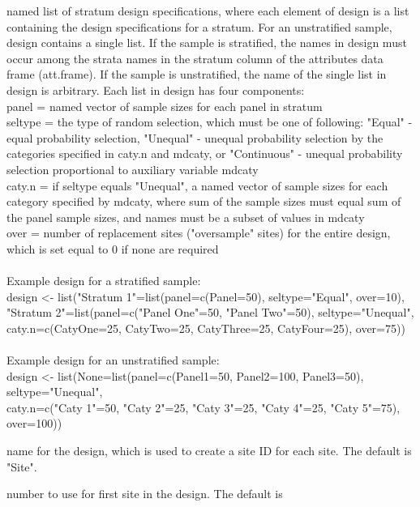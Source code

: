 \begin{Arguments}
\begin{ldescription}
\item[\code{design}] named list of stratum design specifications, where each element of
design is a list containing the design specifications for a stratum.  For
an unstratified sample, design contains a single list.  If the sample is
stratified, the names in design must occur among the strata names in the
stratum column of the attributes data frame (att.frame).  If the sample is
unstratified, the name of the single list in design is arbitrary.  Each
list in design has four components:\\
panel = named vector of sample sizes for each panel in stratum\\
seltype = the type of random selection, which must be one of following:
"Equal" - equal probability selection, "Unequal" - unequal probability
selection by the categories specified in caty.n and mdcaty, or
"Continuous" - unequal probability selection proportional to auxiliary
variable mdcaty\\
caty.n = if seltype equals "Unequal", a named vector of sample sizes for
each category specified by mdcaty, where sum of the sample sizes must
equal sum of the panel sample sizes, and names must be a subset of
values in mdcaty\\
over = number of replacement sites ("oversample" sites) for the entire
design, which is set equal to 0 if none are required\\\\
Example design for a stratified sample:\\
design <- list("Stratum 1"=list(panel=c(Panel=50), seltype="Equal",
over=10),\\ "Stratum 2"=list(panel=c("Panel One"=50, "Panel Two"=50),
seltype="Unequal",\\ caty.n=c(CatyOne=25, CatyTwo=25, CatyThree=25,
CatyFour=25), over=75))\\\\
Example design for an unstratified sample:\\
design <- list(None=list(panel=c(Panel1=50, Panel2=100, Panel3=50),
seltype="Unequal",\\ caty.n=c("Caty 1"=50, "Caty 2"=25, "Caty 3"=25,
"Caty 4"=25, "Caty 5"=75), over=100))\\
\item[\code{DesignID}] name for the design, which is used to create a site
ID for each site.  The default is "Site".
\item[\code{SiteBegin}] number to use for first site in the design.  The default is

\end{ldescription}
\end{Arguments}
